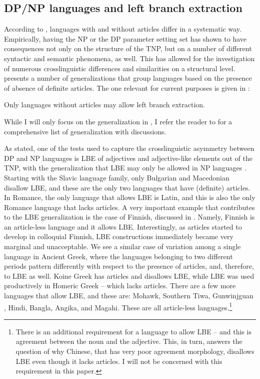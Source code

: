 \documentclass[output=paper,hidelinks,newtxmath,]{langscibook}
\begin{document}
\subsection{DP/NP languages and left branch extraction}\label{15:s3.2}

According to \citet{Boskovic2008,Boskovic2012}, languages with and without articles differ in a systematic way. Empirically, having the NP or the DP parameter setting set has shown to have consequences not only on the structure of the TNP, but on a number of different syntactic and semantic phenomena, as well. This has allowed for the investigation of numerous crosslinguistic differences and similarities on a structural level. \citet{Boskovic2008,Boskovic2012} presents a number of generalizations that group languages based on the presence of absence of definite articles. The one relevant for current purposes is given in :

\ea\label{15:ex1}
  Only languages without articles may allow left branch extraction.
\z

\noindent While I will only focus on the generalization in , I refer the reader to \citet{Boskovic2008,Boskovic2012} for a comprehensive list of generalization with discussions.

As stated, one of the tests used to capture the crosslinguistic asymmetry between DP and NP languages is LBE of adjectives and adjective-like elements out of the TNP, with the generalization that LBE may only be allowed in NP languages \citet{Boskovic2008,Boskovic2012}. Starting with the Slavic language family, only Bulgarian and Macedonian disallow LBE, and these are the only two languages that have (definite) articles. In Romance, the only language that allows LBE is Latin, and this is also the only Romance language that lacks articles. A very important example that contributes to the LBE generalization is the case of Finnish, discussed in \citet{Franks2007}. Namely, Finnish is an article-less language and it allows LBE. Interestingly, as articles started to develop in colloquial Finnish, LBE constructions immediately became very marginal and unacceptable. We see a similar case of variation among a single language in Ancient Greek, where the languages belonging to two different periods pattern differently with respect to the presence of articles, and, therefore, to LBE as well. Koine Greek has articles and disallows LBE, while LBE was used productively in Homeric Greek – which lacks articles. There are a few more languages that allow LBE, and these are: Mohawk, Southern Tiwa, Gunwinjguan \citep{Baker1996}, Hindi, Bangla, Angika, and Magahi. These are all article-less languages.\largerpage\footnote{\label{15:fn2}There is an additional requirement for a language to allow LBE -- and this is agreement between the noun and the adjective. This, in turn, answers the question of why Chinese, that has very poor agreement morphology, disallows LBE even though it lacks articles. I will not be concerned with this requirement in this paper.}
\end{document}
